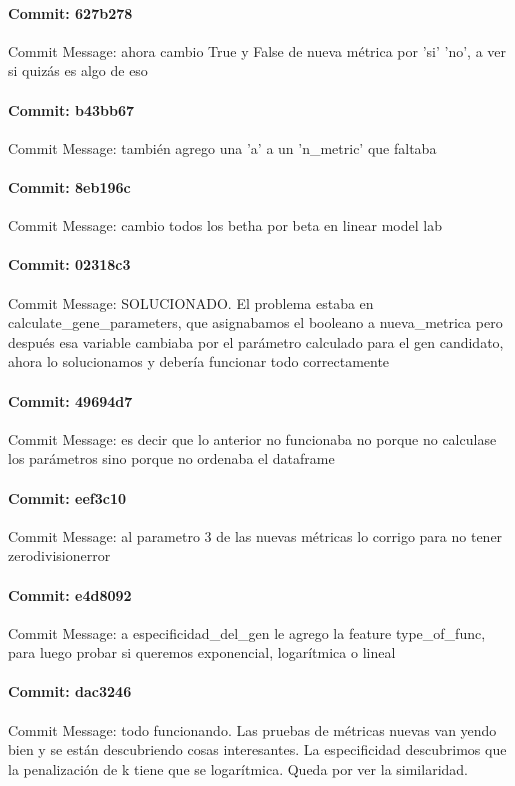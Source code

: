 \documentclass{article}
\begin{document}
\paragraph{Commit: 627b278}
Commit Message: ahora cambio True y False de nueva métrica por 'si' 'no', a ver si quizás es algo de eso

\paragraph{Commit: b43bb67}
Commit Message: también agrego una 'a' a un 'n_metric' que faltaba

\paragraph{Commit: 8eb196c}
Commit Message: cambio todos los betha por beta en linear model lab

\paragraph{Commit: 02318c3}
Commit Message: SOLUCIONADO. El problema estaba en calculate_gene_parameters, que asignabamos el booleano a nueva_metrica pero después esa variable cambiaba por el parámetro calculado para el gen candidato, ahora lo solucionamos y debería funcionar todo correctamente

\paragraph{Commit: 49694d7}
Commit Message: es decir que lo anterior no funcionaba no porque no calculase los parámetros sino porque no ordenaba el dataframe

\paragraph{Commit: eef3c10}
Commit Message: al parametro 3 de las nuevas métricas lo corrigo para no tener zerodivisionerror

\paragraph{Commit: e4d8092}
Commit Message: a especificidad_del_gen le agrego la feature type_of_func, para luego probar si queremos exponencial, logarítmica o lineal

\paragraph{Commit: dac3246}
Commit Message: todo funcionando. Las pruebas de métricas nuevas van yendo bien y se están descubriendo cosas interesantes. La especificidad descubrimos que la penalización de k tiene que se logarítmica. Queda por ver la similaridad.
\end{document}
